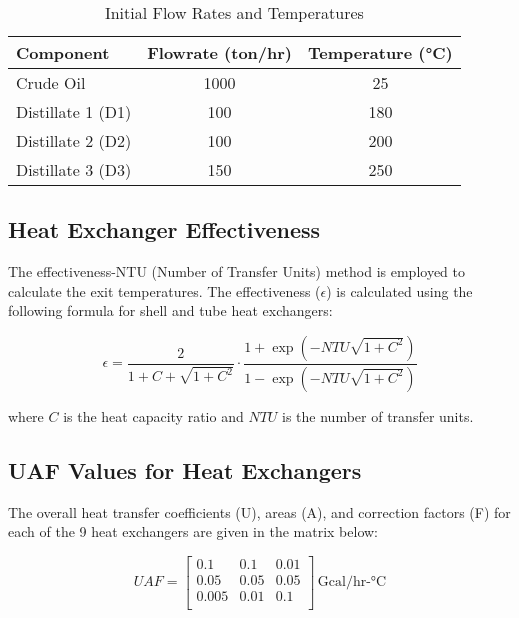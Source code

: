 \documentclass[12pt]{article}
\begin{document}
\begin{table}[h!]
    \centering
    \caption{Initial Flow Rates and Temperatures}
    \label{tab:initial_conditions}
    \begin{tabular}{lcc}
        \toprule
        \textbf{Component} & \textbf{Flowrate (ton/hr)} & \textbf{Temperature (°C)} \\
        \midrule
        Crude Oil & 1000 & 25 \\
        Distillate 1 (D1) & 100 & 180 \\
        Distillate 2 (D2) & 100 & 200 \\
        Distillate 3 (D3) & 150 & 250 \\
        \bottomrule
    \end{tabular}
\end{table}

\subsection{Heat Exchanger Effectiveness}
The effectiveness-NTU (Number of Transfer Units) method is employed to calculate the exit temperatures. The effectiveness (\( \epsilon \)) is calculated using the following formula for shell and tube heat exchangers:

\begin{equation}
\epsilon = \frac{2}{1 + C + \sqrt{1 + C^2}} \cdot \frac{1 + \exp\left(-NTU \sqrt{1 + C^2}\right)}{1 - \exp\left(-NTU \sqrt{1 + C^2}\right)}
\end{equation}

where \( C \) is the heat capacity ratio and \( NTU \) is the number of transfer units.

\subsection{UAF Values for Heat Exchangers}
The overall heat transfer coefficients (U), areas (A), and correction factors (F) for each of the 9 heat exchangers are given in the matrix below:

\begin{equation}
UAF =
\begin{bmatrix}
0.1 & 0.1 & 0.01 \\
0.05 & 0.05 & 0.05 \\
0.005 & 0.01 & 0.1 \\
\end{bmatrix} \, \text{Gcal/hr-°C}
\end{equation}
\end{document}
